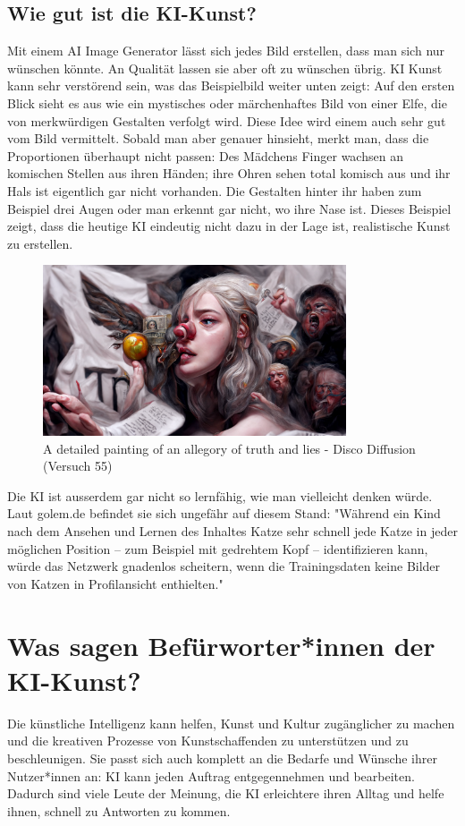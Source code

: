 \documentclass{article}
\begin{document}
    \subsection{Wie gut ist die KI-Kunst?}
        Mit einem AI Image Generator lässt sich jedes Bild erstellen, dass man sich nur wünschen könnte. 
        An Qualität lassen sie aber oft zu wünschen übrig. 
        KI Kunst kann sehr verstörend sein, was das Beispielbild weiter unten zeigt: Auf den ersten Blick sieht es aus wie ein mystisches oder märchenhaftes Bild von einer Elfe, die von merkwürdigen Gestalten verfolgt wird. Diese Idee wird einem auch sehr gut vom Bild vermittelt. Sobald man aber genauer hinsieht, merkt man, dass die Proportionen überhaupt nicht passen: Des Mädchens Finger wachsen an komischen Stellen aus ihren Händen; ihre Ohren sehen total komisch aus und ihr Hals ist eigentlich gar nicht vorhanden. Die Gestalten hinter ihr haben zum Beispiel drei Augen oder man erkennt gar nicht, wo ihre Nase ist. Dieses Beispiel zeigt, dass die heutige KI eindeutig nicht dazu in der Lage ist, realistische Kunst zu erstellen.
        \begin{figure}[ht]
        \centering
        \includegraphics[width=0.8\textwidth]{ki-bild.png} 
        \caption{A detailed painting of an allegory of truth and lies - Disco Diffusion (Versuch 55)}
        \label{fig:ki-bild}
        \end{figure}
    
        Die KI ist ausserdem gar nicht so lernfähig, wie man vielleicht denken würde. Laut golem.de befindet sie sich ungefähr auf diesem Stand: "Während ein Kind nach dem Ansehen und Lernen des Inhaltes Katze sehr schnell jede Katze in jeder möglichen Position – zum Beispiel mit gedrehtem Kopf – identifizieren kann, würde das Netzwerk gnadenlos scheitern, wenn die Trainingsdaten keine Bilder von Katzen in Profilansicht enthielten." 

\section{Was sagen Befürworter*innen der KI-Kunst?}
    Die künstliche Intelligenz kann helfen, Kunst und Kultur zugänglicher zu machen und die kreativen 
    Prozesse von Kunstschaffenden zu unterstützen und zu beschleunigen.  Sie passt sich auch komplett an die Bedarfe und Wünsche ihrer Nutzer*innen an: KI kann jeden Auftrag entgegennehmen und bearbeiten. Dadurch sind viele Leute der Meinung, die KI erleichtere ihren Alltag und helfe ihnen, schnell zu Antworten zu kommen.
\end{document}
